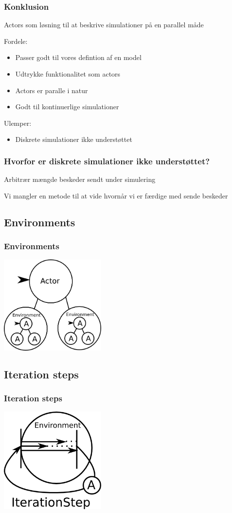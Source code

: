 \begin{frame}
	\frametitle{Konklusion}
	Actors som løsning til at beskrive simulationer på en parallel måde
	
	
  Fordele:
    \begin{itemize}
      \item Passer godt til vores defintion af en model
      \item Udtrykke funktionalitet som actors
      \item Actors er paralle i natur
      \item Godt til kontinuerlige simulationer
    \end{itemize}
  Ulemper:
    \begin{itemize}
      \item Diskrete simulationer ikke understøttet
    \end{itemize}
\end{frame}

\begin{frame}
  \frametitle{Hvorfor er diskrete simulationer ikke understøttet?}
    Arbitrær mængde beskeder sendt under simulering\newline
    
    
    Vi mangler en metode til at vide hvornår vi er færdige med sende beskeder
\end{frame}

\subsection{Environments}
\begin{frame}
	\frametitle{Environments}
	\includegraphics[width=200px]{Images/environment.png}
\end{frame}
\subsection{Iteration steps}
\begin{frame}
  \frametitle{Iteration steps}
  \includegraphics[width=200px]{Images/iteration.png}
\end{frame}

